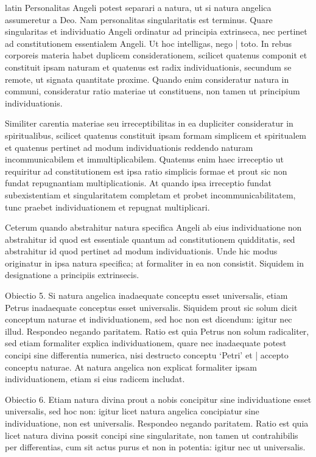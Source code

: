 \begin{otherlanguage*}{latin}
\pstart
 Personalitas Angeli potest separari a natura, ut si natura angelica assumeretur a Deo. Nam personalitas singularitatis est terminus. Quare singularitas et individuatio Angeli ordinatur ad principia extrinseca, nec pertinet ad constitutionem essentialem Angeli. Ut hoc intelligas, nego \textnormal{|}   toto. In rebus corporeis materia habet duplicem considerationem, scilicet quatenus componit et constituit ipsam naturam et quatenus est radix individuationis, secundum se remote, ut signata quantitate proxime. Quando enim consideratur natura in communi, consideratur ratio materiae ut constituens, non tamen ut principium individuationis. 
\pend

\pstart
 Similiter carentia materiae seu irreceptibilitas in ea dupliciter consideratur in spiritualibus, scilicet quatenus constituit ipsam formam simplicem et spiritualem et quatenus pertinet ad modum individuationis reddendo naturam incommunicabilem et immultiplicabilem. Quatenus enim haec irreceptio ut requiritur ad constitutionem est ipsa ratio simplicis formae et prout sic non fundat repugnantiam multiplicationis. At quando ipsa irreceptio fundat subexistentiam et singularitatem completam et probet incommunicabilitatem, tunc praebet individuationem et repugnat multiplicari. 
\pend

\pstart
 Ceterum quando abstrahitur natura specifica Angeli ab eius individuatione non abstrahitur id quod est essentiale quantum ad constitutionem quidditatis, sed abstrahitur id quod pertinet ad modum individuationis. Unde hic modus originatur in ipsa natura specifica; at formaliter in ea non consistit. Siquidem in designatione a principiis extrinsecis. 
\pend

\pstart
 Obiectio 5. Si natura angelica inadaequate conceptu esset universalis, etiam Petrus inadaequate conceptus esset universalis. Siquidem prout sic solum dicit conceptum naturae et individuationem, sed hoc non est dicendum: igitur nec illud. Respondeo negando paritatem. Ratio est quia Petrus non solum radicaliter, sed etiam formaliter explica individuationem, quare nec inadaequate potest concipi sine differentia numerica, nisi destructo conceptu `Petri' et \textnormal{|} accepto conceptu naturae. At natura angelica non explicat formaliter ipsam individuationem, etiam si eius radicem includat. 
\pend

\pstart
  Obiectio 6. Etiam natura divina prout a nobis concipitur sine individuatione esset universalis, sed hoc non: igitur licet natura angelica concipiatur sine individuatione, non est universalis. Respondeo negando paritatem. Ratio est quia licet natura divina possit concipi sine singularitate, non tamen ut contrahibilis per differentias, cum sit actus purus et non in potentia: igitur nec ut universalis. 
\pend


\end{otherlanguage*}
